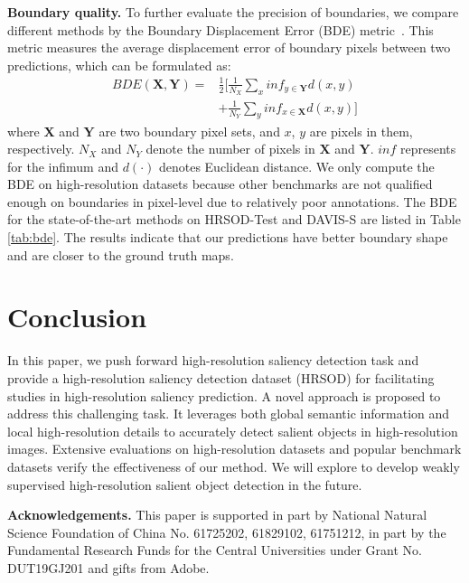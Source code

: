 \documentclass[10pt,twocolumn,letterpaper]{article}
\begin{document}
\textbf{Boundary quality.} To further evaluate the precision of boundaries, we compare different methods by the Boundary Displacement Error (BDE) metric~\cite{freixenet2002yet}. This metric measures the average displacement error of boundary pixels between two predictions, which can be formulated as: \begin{equation*}
\begin{split}
 BDE(\bm{X},\bm{Y})=&\frac{1}{2}\bigg[\frac{1}{N_X}\sum_{x}inf_{y\in \bm{Y}}d(x,y)\\
 &+\frac{1}{N_Y}\sum_{y} inf_{x\in \bm{X}}d(x,y)\bigg]
\end{split}
\end{equation*}
where $\bm{X}$ and $\bm{Y}$ are two boundary pixel sets, and $x$, $y$ are pixels in them, respectively. $N_X$ and $N_Y$ denote the number of pixels in $\bm{X}$ and $\bm{Y}$. $inf$ represents for the infimum and $d(\cdot)$ denotes Euclidean distance. We only compute the BDE on high-resolution datasets because other benchmarks are not qualified enough on boundaries in pixel-level due to relatively poor annotations. The BDE for the state-of-the-art methods on HRSOD-Test and DAVIS-S are listed in Table \ref{tab:bde}. The results indicate that our predictions have better boundary shape and are closer to the ground truth maps.
\section{Conclusion}
In this paper, we push forward high-resolution saliency detection task and provide a high-resolution saliency detection dataset (HRSOD) for facilitating studies in high-resolution saliency prediction. A novel approach is proposed to address this challenging task. It leverages both global semantic information and local high-resolution details to accurately detect salient objects in high-resolution images. Extensive evaluations on high-resolution datasets and popular benchmark datasets verify the effectiveness of our method. We will explore to develop weakly supervised high-resolution salient object detection in the future.


\noindent\textbf{Acknowledgements.} This paper is supported in part by National Natural Science Foundation of China No. 61725202, 61829102, 61751212, in part by the Fundamental Research Funds for the Central Universities under Grant No. DUT19GJ201 and gifts from Adobe.

{\small


}
\end{document}
